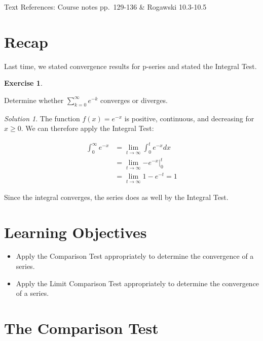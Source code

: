 \documentclass[
]{book}
\providecommand{\tightlist}{%
  \setlength{\itemsep}{0pt}\setlength{\parskip}{0pt}}
\theoremstyle{definition}
\theoremstyle{definition}
\theoremstyle{definition}
\newtheorem{exercise}{Exercise}[chapter]
\theoremstyle{definition}
\theoremstyle{remark}
\newtheorem*{solution}{Solution}
\begin{document}
Text References: Course notes pp.~129-136 \& Rogawski 10.3-10.5

\hypertarget{recap-26}{%
\section{Recap}\label{recap-26}}

Last time, we stated convergence results for p-series and stated the Integral Test.

\begin{exercise}
\protect\hypertarget{exr:unlabeled-div-197}{}\label{exr:unlabeled-div-197}

Determine whether \(\displaystyle \sum_{k=0}^\infty e^{-k}\) converges or diverges.

\end{exercise}

\begin{solution}

The function \(f(x)=e^{-x}\) is positive, continuous, and decreasing for \(x\geq 0\). We can therefore apply the Integral Test:

\begin{align*}
\int_0^\infty e^{-x} &= \lim_{t\to\infty} \int_0^t e^{-x} dx \\
&= \lim_{t\to\infty} \left. -e^{-x} \right|_{0}^t\\
&= \lim_{t\to\infty}  1-e^{-t} = 1
\end{align*}

Since the integral converges, the series does as well by the Integral Test.

\end{solution}

\hypertarget{learning-objectives-27}{%
\section{Learning Objectives}\label{learning-objectives-27}}

\begin{itemize}
\tightlist
\item
  Apply the Comparison Test appropriately to determine the convergence of a series.
\item
  Apply the Limit Comparison Test appropriately to determine the convergence of a series.
\end{itemize}

\hypertarget{the-comparison-test}{%
\section{The Comparison Test}\label{the-comparison-test}}
\end{document}
